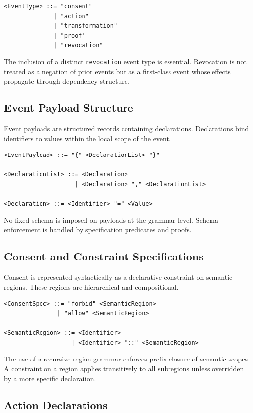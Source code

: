 \documentclass[11pt,oneside]{article}
\begin{document}
\begin{verbatim}
<EventType> ::= "consent"
              | "action"
              | "transformation"
              | "proof"
              | "revocation"
\end{verbatim}

The inclusion of a distinct \texttt{revocation} event type is essential. Revocation is not treated as a negation of prior events but as a first-class event whose effects propagate through dependency structure.

\subsection{Event Payload Structure}

Event payloads are structured records containing declarations. Declarations bind identifiers to values within the local scope of the event.

\begin{verbatim}
<EventPayload> ::= "{" <DeclarationList> "}"

<DeclarationList> ::= <Declaration>
                    | <Declaration> "," <DeclarationList>

<Declaration> ::= <Identifier> "=" <Value>
\end{verbatim}

No fixed schema is imposed on payloads at the grammar level. Schema enforcement is handled by specification predicates and proofs.

\subsection{Consent and Constraint Specifications}

Consent is represented syntactically as a declarative constraint on semantic regions. These regions are hierarchical and compositional.

\begin{verbatim}
<ConsentSpec> ::= "forbid" <SemanticRegion>
               | "allow" <SemanticRegion>

<SemanticRegion> ::= <Identifier>
                   | <Identifier> "::" <SemanticRegion>
\end{verbatim}

The use of a recursive region grammar enforces prefix-closure of semantic scopes. A constraint on a region applies transitively to all subregions unless overridden by a more specific declaration.

\subsection{Action Declarations}
\end{document}

